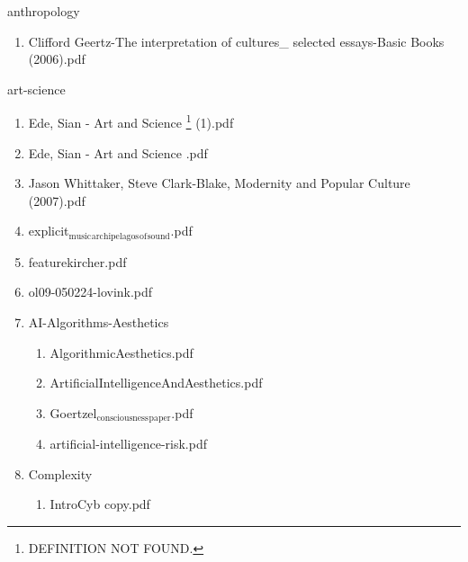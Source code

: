 \documentclass[11pt]{article}
\begin{document}
\item anthropology
\label{sec-1-1-1-1-10}
\begin{enumerate}
\item Clifford Geertz-The interpretation of cultures\_ selected essays-Basic Books (2006).pdf
\label{sec-1-1-1-1-10-1}
\end{enumerate}

\item art-science
\label{sec-1-1-1-1-11}
\begin{enumerate}
\item Ede, Sian - Art and Science \footnote{DEFINITION NOT FOUND.} (1).pdf
\label{sec-1-1-1-1-11-1}

\item Ede, Sian - Art and Science \footnotemark[2]{}.pdf
\label{sec-1-1-1-1-11-2}

\item Jason Whittaker, Steve Clark-Blake, Modernity and Popular Culture (2007).pdf
\label{sec-1-1-1-1-11-3}

\item explicit$_{\text{music}}$$_{\text{archipelagos}}$$_{\text{of}}$$_{\text{sound}}$.pdf
\label{sec-1-1-1-1-11-4}

\item featurekircher.pdf
\label{sec-1-1-1-1-11-5}

\item ol09-050224-lovink.pdf
\label{sec-1-1-1-1-11-6}

\item AI-Algorithms-Aesthetics
\label{sec-1-1-1-1-11-7}
\begin{enumerate}
\item AlgorithmicAesthetics.pdf
\label{sec-1-1-1-1-11-7-1}

\item ArtificialIntelligenceAndAesthetics.pdf
\label{sec-1-1-1-1-11-7-2}

\item Goertzel$_{\text{consciousness}}$$_{\text{paper}}$.pdf
\label{sec-1-1-1-1-11-7-3}

\item artificial-intelligence-risk.pdf
\label{sec-1-1-1-1-11-7-4}
\end{enumerate}

\item Complexity
\label{sec-1-1-1-1-11-8}
\begin{enumerate}
\item IntroCyb copy.pdf
\label{sec-1-1-1-1-11-8-1}


\end{enumerate}
\end{enumerate}
\end{document}
